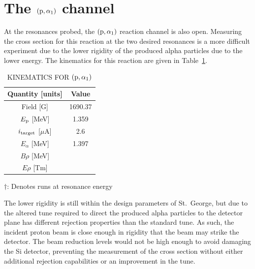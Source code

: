 \section{The $({\rm p},\alpha_1)$ channel}
\label{sec:the-palpha_1-channel}

At the resonances probed, the $({\rm p},\alpha_1)$ reaction channel is
also open. Measuring the cross section for this reaction at the two
desired resonances is a more difficult experiment due to the lower
rigidity of the produced alpha particles due to the lower energy. The
kinematics for this reaction are given in Table~\ref{tab:alpha-one}.

\begin{table}
    \begin{center}
        \caption{KINEMATICS FOR $({\rm p},\alpha_1)$}
        \label{tab:alpha-one}
        \begin{tabular}{cc}
            \toprule
            \midrule
            \textbf{Quantity [units]} & \textbf{Value} \\
            \midrule
                Field [G]                   & 1690.37 \\
                $E_{\rm p}$ [MeV]           & 1.359 \\
                $i_{\rm target}$ [$\mu$A]   & 2.6 \\
                $E_{\alpha}$ [MeV]          & 1.397 \\
                $B\rho$ [MeV]               & \\
                $E\rho$ [Tm]                & \\
            \bottomrule
        \end{tabular}

        \vspace{0.5em}
        $\dagger$: Denotes runs at resonance energy
    \end{center}
\end{table}

The lower rigidity is still within the design parameters of St.\ George,
but due to the altered tune required to direct the produced alpha
particles to the detector plane has different rejection properties than
the standard tune. As such, the incident proton beam is close enough in
rigidity that the beam may strike the detector. The beam reduction
levels would not be high enough to avoid damaging the Si detector,
preventing the measurement of the cross section without either
additional rejection capabilities or an improvement in the tune.

